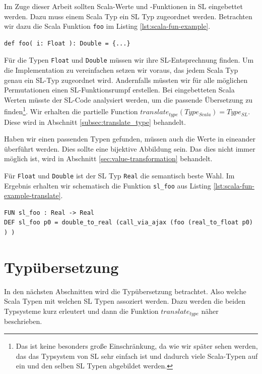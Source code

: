 \documentclass[12pt]{scrreprt}
\begin{document}
Im Zuge dieser Arbeit sollten Scala-Werte und -Funktionen in \ac{SL} eingebettet werden. Dazu muss einem Scala Typ ein \ac{SL} Typ zugeordnet werden. Betrachten wir dazu die Scala Funktion \lstinline!foo! im Listing \ref{lst:scala-fun-example}.

\begin{lstlisting}[caption=Beispielfunktion foo, label=lst:scala-fun-example]
def foo( i: Float ): Double = {...}
\end{lstlisting}

Für die Typen \lstinline!Float! und \lstinline!Double! müssen wir ihre \ac{SL}-Entsprechnung finden. Um die Implementation zu vereinfachen setzen wir voraus, das jedem Scala Typ genau ein \ac{SL}-Typ zugeordnet wird. Andernfalls müssten wir für alle möglichen Permutationen einen \ac{SL}-Funktionsrumpf erstellen. Bei eingebetteten Scala Werten müsste der SL-Code analysiert werden, um die passende Übersetzung zu finden\footnote{Das ist keine besonders große Einschränkung, da wie wir später sehen werden, das das Typsystem von SL sehr einfach ist und dadurch viele Scala-Typen auf ein und den selben SL Typen abgebildet werden. }. Wir erhalten die partielle Function $translate_{type}(Type_{Scala}) = Type_{SL}$. Diese wird in Abschnitt \ref{subsec:translate_type} behandelt.

Haben wir einen passenden Typen gefunden, müssen auch die Werte in eineander überführt werden. Dies sollte eine bijektive Abbildung sein. Das dies nicht immer möglich ist, wird in Abschnitt \ref{sec:value-transformation} behandelt.

Für \lstinline!Float! und \lstinline!Double! ist der SL Typ \lstinline!Real! die semantisch beste Wahl. Im Ergebnis erhalten wir schematisch die Funktion \lstinline!sl_foo! aus Listing \ref{lst:scala-fun-example-translate}.

\begin{lstlisting}[caption=Übersetzung von foo, label=lst:scala-fun-example-translate]
FUN sl_foo : Real -> Real
DEF sl_foo p0 = double_to_real (call_via_ajax (foo (real_to_float p0) ) )
\end{lstlisting}

\section{Typübersetzung}
\label{sec:type-translation}

In den nächsten Abschnitten wird die Typübersetzung betrachtet. Also welche Scala Typen mit welchen SL Typen assoziert werden. Dazu werden die beiden Typsysteme kurz erleutert und dann die Funktion $translate_{type}$ näher beschrieben.
\end{document}
